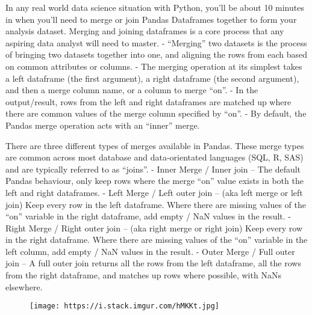 \documentclass[11pt]{article}
\makeatletter
\def\maxwidth{\ifdim\Gin@nat@width>\linewidth\linewidth
    \else\Gin@nat@width\fi}
\let\Oldincludegraphics\includegraphics
\renewcommand{\includegraphics}[1]{\Oldincludegraphics[width=.8\maxwidth]{#1}}
\makeatother
\begin{document}
In any real world data science situation with Python, you'll be about 10
minutes in when you'll need to merge or join Pandas Dataframes together
to form your analysis dataset. Merging and joining dataframes is a core
process that any aspiring data analyst will need to master. -
``Merging'' two datasets is the process of bringing two datasets
together into one, and aligning the rows from each based on common
attributes or columns. - The merging operation at its simplest takes a
left dataframe (the first argument), a right dataframe (the second
argument), and then a merge column name, or a column to merge ``on''. -
In the output/result, rows from the left and right dataframes are
matched up where there are common values of the merge column specified
by ``on''. - By default, the Pandas merge operation acts with an
``inner'' merge.

There are three different types of merges available in Pandas. These
merge types are common across most database and data-orientated
languages (SQL, R, SAS) and are typically referred to as ``joins''. -
Inner Merge / Inner join -- The default Pandas behaviour, only keep rows
where the merge ``on'' value exists in both the left and right
dataframes. - Left Merge / Left outer join -- (aka left merge or left
join) Keep every row in the left dataframe. Where there are missing
values of the ``on'' variable in the right dataframe, add empty / NaN
values in the result. - Right Merge / Right outer join -- (aka right
merge or right join) Keep every row in the right dataframe. Where there
are missing values of the ``on'' variable in the left column, add empty
/ NaN values in the result. - Outer Merge / Full outer join -- A full
outer join returns all the rows from the left dataframe, all the rows
from the right dataframe, and matches up rows where possible, with NaNs
elsewhere.

\begin{figure}
\centering
\texttt{[image: https://i.stack.imgur.com/hMKKt.jpg]}
\caption{}
\end{figure}
\end{document}
